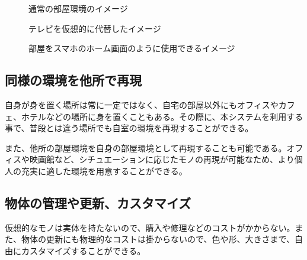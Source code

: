 \begin{figure}[htbp]
    \begin{center}
    \end{center}
    \caption{通常の部屋環境のイメージ}
    \label{fig:normal-room}
  \end{figure}

\begin{figure}[htbp]
    \begin{minipage}{0.5\hsize}
      \begin{center}
      \end{center}
      \label{fig:bigTV}
      \caption{テレビを仮想的に代替したイメージ}
    \end{minipage}
    \begin{minipage}{0.5\hsize}
      \begin{center}
      \end{center}
      \caption{部屋をスマホのホーム画面のように使用できるイメージ}
      \label{fig:widget}
    \end{minipage}
\end{figure}

\subsection{同様の環境を他所で再現}

自身が身を置く場所は常に一定ではなく、自宅の部屋以外にもオフィスやカフェ、ホテルなどの場所に身を置くこともある。その際に、本システムを利用する事で、普段とは違う場所でも自室の環境を再現することができる。

また、他所の部屋環境を自身の部屋環境として再現することも可能である。オフィスや映画館など、シチュエーションに応じたモノの再現が可能なため、より個人の充実に適した環境を用意することができる。

\subsection{物体の管理や更新、カスタマイズ}

仮想的なモノは実体を持たないので、購入や修理などのコストがかからない。また、物体の更新にも物理的なコストは掛からないので、色や形、大きさまで、自由にカスタマイズすることができる。

